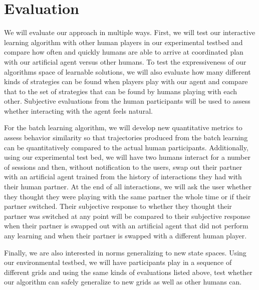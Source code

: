 
\section{Evaluation}

We will evaluate our approach in multiple ways. First, we will test our interactive learning algorithm with other human players in our experimental testbed and compare how often and quickly humans are able to arrive at coordinated plan with our artificial agent versus other humans. To test the expressiveness of our algorithms space of learnable solutions, we will also evaluate how many different kinds of strategies can be found when players play with our agent and compare that to the set of strategies that can be found by humans playing with each other. Subjective evaluations from the human participants will be used to assess whether interacting with the agent feels natural. 

For the batch learning algorithm, we will develop new quantitative metrics to assess behavior similarity so that trajectories produced from the batch learning can be quantitatively compared to the actual human participants. Additionally, using our experimental test bed, we will have two humans interact for a number of sessions and then, without notification to the users, swap out their partner with an artificial agent trained from the history of interactions they had with their human partner. At the end of all interactions, we will ask the user whether they thought they were playing with the same partner the whole time or if their partner switched. Their subjective response to whether they thought their partner was switched at any point will be compared to their subjective response when their partner is swapped out with an artificial agent that did not perform any learning and when their partner is swapped with a different human player.

Finally, we are also interested in norms generalizing to new state spaces. Using our environmental testbed, we will have participants play in a sequence of different grids and using the same kinds of evaluations listed above, test whether our algorithm can safely generalize to new grids as well as other humans can.
